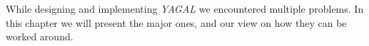 While designing and implementing \textit{YAGAL} we encountered multiple problems. In this chapter we will present the major ones, and our view on how they can be worked around.